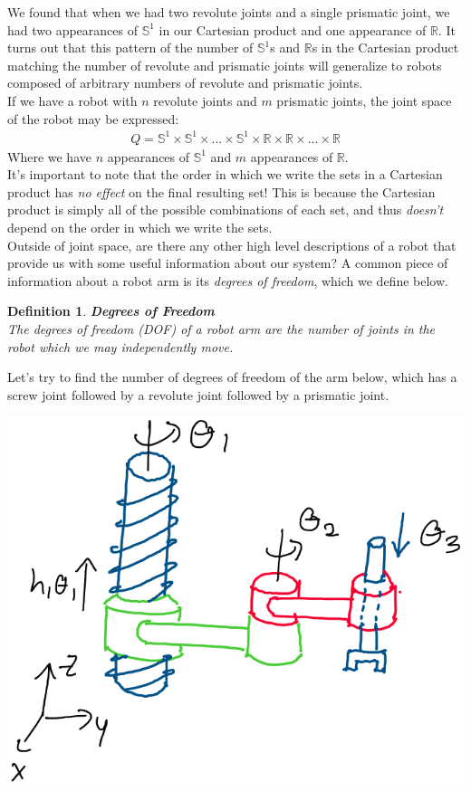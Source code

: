 \documentclass[oneside]{book}
\newtheorem{definition}{Definition}
\newenvironment{defn} %
  {\colorlet{shadecolor}{orange!15}\begin{shaded}\begin{definition}}
  {\end{definition}\end{shaded}}
\begin{document}
We found that when we had two revolute joints and a single prismatic joint, we had two appearances of $\mathbb{S}^1$ in our Cartesian product and one appearance of $\mathbb{R}$. It turns out that this pattern of the number of $\mathbb{S}^1$s and $\mathbb{R}$s in the Cartesian product matching the number of revolute and prismatic joints will generalize to robots composed of arbitrary numbers of revolute and prismatic joints.\\
If we have a robot with $n$ revolute joints and $m$ prismatic joints, the joint space of the robot may be expressed:
\begin{align}
    Q = \mathbb{S}^1 \times \mathbb{S}^1 \times ... \times \mathbb{S}^1 \times \mathbb{R} \times \mathbb{R} \times  ... \times \mathbb{R} 
\end{align}
Where we have $n$ appearances of $\mathbb{S}^1$ and $m$ appearances of $\mathbb{R}$. \\
It's important to note that the order in which we write the sets in a Cartesian product has \textit{no effect} on the final resulting set! This is because the Cartesian product is simply all of the possible combinations of each set, and thus \textit{doesn't} depend on the order in which we write the sets.\\
Outside of joint space, are there any other high level descriptions of a robot that provide us with some useful information about our system? A common piece of information about a robot arm is its \textit{degrees of freedom}, which we define below.
\begin{defn}
\textbf{Degrees of Freedom}\\
The degrees of freedom (DOF) of a robot arm are the number of joints in the robot which we may independently move.
\end{defn}
\noindent
Let's try to find the number of degrees of freedom of the arm below, which has a screw joint followed by a revolute joint followed by a prismatic joint.
\begin{center}
    \includegraphics[scale=0.3]{images/complexJoints.png}
\end{center}
\end{document}
